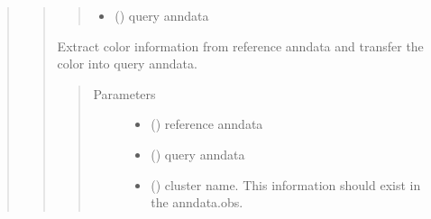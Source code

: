 \documentclass[letterpaper,10pt,english]{sphinxmanual}
\begin{document}
\begin{quote}
\begin{quote}
\begin{fulllineitems}
\begin{quote}
\begin{description}
\begin{itemize}
\item {} 
 () \textendash{} query anndata

\end{itemize}

\end{description}\end{quote}

\end{fulllineitems}


\begin{fulllineitems}
\label{\detokenize{modules/celloracle.utility:celloracle.utility.transfer_color_between_anndata}}
Extract color information from reference anndata and transfer the color into query anndata.
\begin{quote}\begin{description}
\item[{Parameters}] \leavevmode\begin{itemize}
\item {} 
 () \textendash{} reference anndata

\item {} 
 () \textendash{} query anndata

\item {} 
 () \textendash{} cluster name. This information should exist in the anndata.obs.

\end{itemize}

\end{description}\end{quote}

\end{fulllineitems}



\end{quote}
\end{quote}
\end{document}
